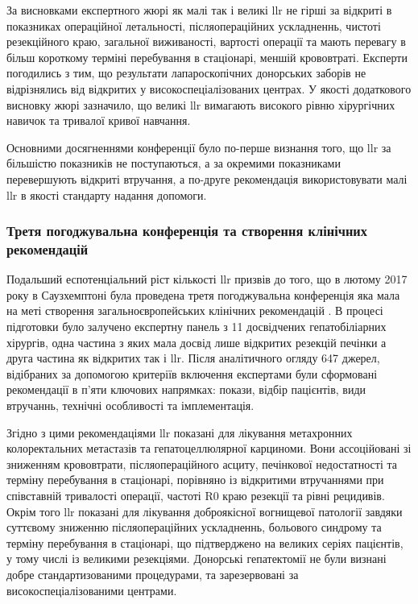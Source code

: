 \begin{refsection}
За висновками експертного жюрі як малі так і великі \acrshort{llr} не гірші за відкриті в показниках операційної летальності, післяопераційних ускладненнь, чистоті резекційного краю, загальної виживаності, вартості операції та мають перевагу в більш короткому терміні перебування в стаціонарі, меншій крововтраті. Експерти погодились з тим, що результати лапароскопічних донорських заборів не відрізнялись від відкритих у високоспеціалізованих центрах. У якості додаткового висновку жюрі зазначило, що великі \acrshort{llr} вимагають високого рівню хірургічних навичок та тривалої кривої навчання.

Основними досягненнями конференції було по-перше визнання того, що  \acrshort{llr} за більшістю показників не поступаються, а за окремими показниками перевершують відкриті втручання, а по-друге рекомендація використовувати малі \acrshort{llr} в якості стандарту надання допомоги.

\subsubsection{Третя погоджувальна конференція та створення клінічних рекомендацій} 

Подальший еспотенціальний ріст кількості \acrshort{llr} призвів до того, що в лютому 2017 року в Саузхемптоні була проведена третя погоджувальна конференція яка мала на меті створення загальноєвропейських клінічних рекомендацій \cite{AbuHilal2017a}. В процесі підготовки було залучено експертну панель з 11 досвідчених гепатобіліарних хірургів, одна частина з яких мала досвід лише відкритих резекцій печінки а друга частина як відкритих так і \acrshort{llr}. Після аналітичного огляду 647 джерел, відібраних за допомогою критеріїв включення експертами були сформовані рекомендації в п'яти ключових напрямках: покази, відбір пацієнтів, види втручаннь, технічні особливості та імплементація.

Згідно з цими рекомендаціями \acrshort{llr} показані для лікування метахронних колоректальних метастазів та гепатоцеллюлярної карциноми.  Вони ассоційовані зі зниженням крововтрати, післяопераційного асциту, печінкової недостатності та терміну перебування в стаціонарі, порівняно із відкритими втручаннями при співставній тривалості операції, частоті R0 краю резекції та рівні рецидивів. Окрім того \acrshort{llr} показані для лікування доброякісної вогнищевої патології завдяки суттєвому зниженню післяопераційних ускладненнь, больового синдрому та терміну перебування в стаціонарі, що підтверджено на великих серіях пацієнтів, у тому числі із великими резекціями. Донорські гепатектомії не були визнані добре стандартизованими процедурами, та зарезервовані за високоспеціалізованими центрами.


\end{refsection}
